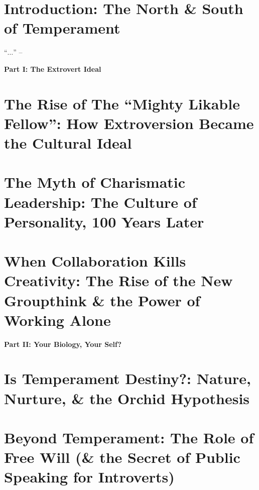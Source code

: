 \documentclass{article}
\numberwithin{equation}{section}
\begin{document}

\section*{Introduction: The North \& South of Temperament}
``$\ldots$'' -- \cite{Cain2013}


\begin{center}\LARGE\sf
	\textbf{Part I: The Extrovert Ideal}
\end{center}

\section{The Rise of The ``Mighty Likable Fellow'': How Extroversion Became the Cultural Ideal}


\section{The Myth of Charismatic Leadership: The Culture of Personality, 100 Years Later}


\section{When Collaboration Kills Creativity: The Rise of the New Groupthink \& the Power of Working Alone}


\begin{center}\LARGE\sf
	\textbf{Part II: Your Biology, Your Self?}
\end{center}

\section{Is Temperament Destiny?: Nature, Nurture, \& the Orchid Hypothesis}


\section{Beyond Temperament: The Role of Free Will (\& the Secret of Public Speaking for Introverts)}
\end{document}
